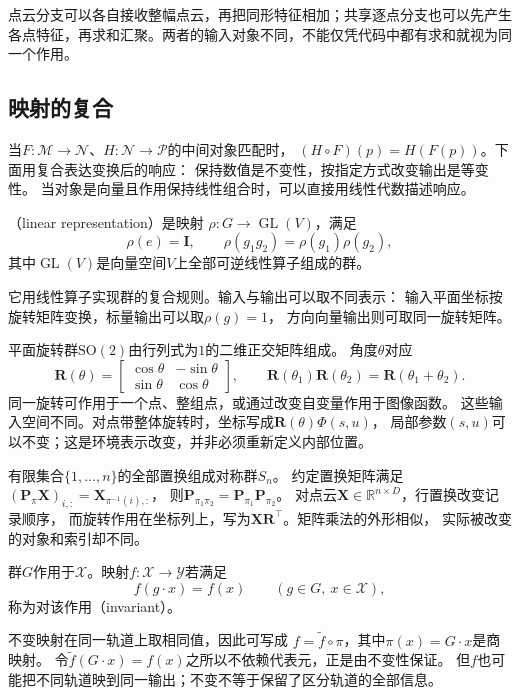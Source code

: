 点云分支可以各自接收整幅点云，再把同形特征相加；共享逐点分支也可以先产生
各点特征，再求和汇聚。两者的输入对象不同，不能仅凭代码中都有求和就视为同一个作用。

\subsection{映射的复合}
\label{sec:geometry-map-composition}
\label{sec:geometry-group-invariance-equivariance}


当$F:\mathcal M\to\mathcal N$、$H:\mathcal N\to\mathcal P$的中间对象匹配时，
$(H\circ F)(p)=H(F(p))$。下面用复合表达变换后的响应：
保持数值是不变性，按指定方式改变输出是等变性。
当对象是向量且作用保持线性组合时，可以直接用线性代数描述响应。
\begin{definition}[线性表示]
\label{def:geometry-linear-representation}
（linear representation）是映射
$\rho:G\to\operatorname{GL}(V)$，满足
\begin{equation}
 \rho(e)=\bm I,\qquad \rho(g_1g_2)=\rho(g_1)\rho(g_2),
 \label{eq:geometry-linear-representation}
\end{equation}
其中$\operatorname{GL}(V)$是向量空间$V$上全部可逆线性算子组成的群。
\end{definition}
它用线性算子实现群的复合规则。输入与输出可以取不同表示：
输入平面坐标按旋转矩阵变换，标量输出可以取$\rho(g)=1$，
方向向量输出则可取同一旋转矩阵。

平面旋转群$\mathrm{SO}(2)$由行列式为$1$的二维正交矩阵组成。
角度$\theta$对应
\begin{equation}
 \bm R(\theta)=
 \begin{bmatrix}\cos\theta&-\sin\theta\\\sin\theta&\cos\theta\end{bmatrix},
 \qquad
 \bm R(\theta_1)\bm R(\theta_2)=\bm R(\theta_1+\theta_2).
 \label{eq:geometry-planar-rotation-group}
\end{equation}
同一旋转可作用于一个点、整组点，或通过改变自变量作用于图像函数。
这些输入空间不同。对点带整体旋转时，坐标写成$\bm R(\theta)\Phi(s,u)$，
局部参数$(s,u)$可以不变；这是环境表示改变，并非必须重新定义内部位置。

有限集合$\{1,\ldots,n\}$的全部置换组成对称群$S_n$。
约定置换矩阵满足$(\bm P_\pi\bm X)_{i,:}=\bm X_{\pi^{-1}(i),:}$，
则$\bm P_{\pi_1\pi_2}=\bm P_{\pi_1}\bm P_{\pi_2}$。
对点云$\bm X\in\mathbb R^{n\times D}$，行置换改变记录顺序，
而旋转作用在坐标列上，写为$\bm X\bm R^\top$。矩阵乘法的外形相似，
实际被改变的对象和索引却不同。


\begin{definition}[不变映射]
\label{def:geometry-invariant-map}
群$G$作用于$\mathcal X$。映射$f:\mathcal X\to\mathcal Y$若满足
\begin{equation}
 f(g\cdot x)=f(x)\qquad(g\in G,\ x\in\mathcal X),
 \label{eq:geometry-invariant-map}
\end{equation}
称为对该作用（invariant）。
\end{definition}
不变映射在同一轨道上取相同值，因此可写成
$f=\widetilde f\circ\pi$，其中$\pi(x)=G\cdot x$是商映射。
令$\widetilde f(G\cdot x)=f(x)$之所以不依赖代表元，正是由不变性保证。
但$f$也可能把不同轨道映到同一输出；不变不等于保留了区分轨道的全部信息。


